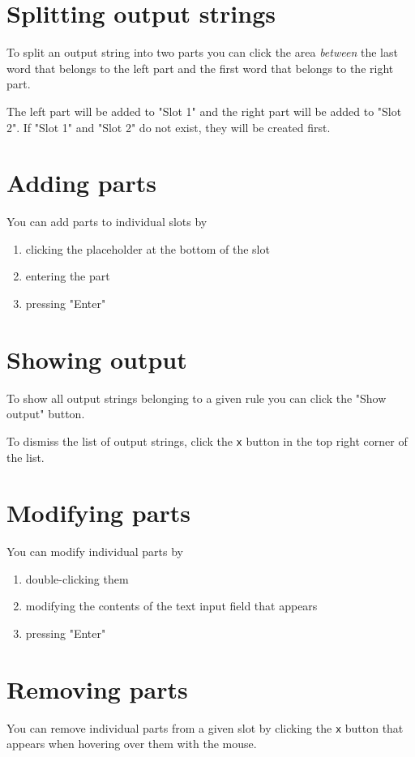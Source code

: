 \documentclass[11pt]{article}
\begin{document}
\section{Splitting output strings}
\label{sec-11}
To split an output string into two parts you can click the area
\emph{between} the last word that belongs to the left part and the first
word that belongs to the right part.

The left part will be added to "Slot 1" and the right part will be
added to "Slot 2". If "Slot 1" and "Slot 2" do not exist, they will
be created first.

\section{Adding parts}
\label{sec-12}
You can add parts to individual slots by

\begin{enumerate}
\item clicking the placeholder at the bottom of the slot
\item entering the part
\item pressing "Enter"
\end{enumerate}

\section{Showing output}
\label{sec-13}
To show all output strings belonging to a given rule you can click
the "Show output" button.

To dismiss the list of output strings, click the \texttt{x} button in the
top right corner of the list.

\section{Modifying parts}
\label{sec-14}
You can modify individual parts by

\begin{enumerate}
\item double-clicking them
\item modifying the contents of the text input field that appears
\item pressing "Enter"
\end{enumerate}

\section{Removing parts}
\label{sec-15}
You can remove individual parts from a given slot by clicking the
\texttt{x} button that appears when hovering over them with the mouse.
\end{document}
